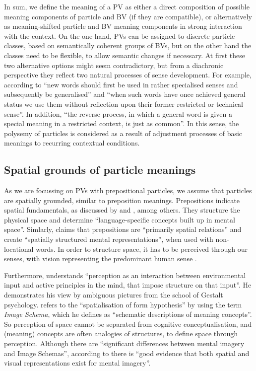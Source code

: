 \documentclass[output=paper]{langsci/langscibook}
\begin{document}
In sum, we define the meaning of a PV as either a direct composition
of possible meaning components of particle and BV (if they are
compatible), or alternatively as meaning-shifted particle and BV
meaning components in strong interaction with the context. On the one
hand, PVs can be assigned to discrete particle classes, based on
semantically coherent groups of BVs, but on the other hand the classes
need to be flexible, to allow semantic changes if necessary. At first
these two alternative options might seem contradictory, but from a
diachronic perspective they reflect two natural processes of sense
development. For example, according to \cite{Waldron:79} ``new words
should first be used in rather specialised senses and subsequently be
generalised'' and ``when such words have once achieved general status
we use them without reflection upon their former restricted or
technical sense''. In addition, ``the reverse process, in which a
general word is given a special meaning in a restricted context, is
just as common''. In this sense, the polysemy of particles is
considered as a result of adjustment processes of basic meanings to
recurring contextual conditions.

\subsection{Spatial grounds of particle meanings}

As we are focussing on PVs with prepositional particles, we assume
that particles are spatially grounded, similar to preposition
meanings. Prepositions indicate spatial fundamentals, as discussed by
\cite{Herskovits:86} and \cite{Dirven:93}, among others. They
structure the physical space and determine ``language-specific
concepts built up in mental space''. Simlarly, \cite{Gaerdenfors:04}
claims that prepositions are ``primarily spatial relations'' and
create ``spatially structured mental representations'', when used with
non-locational words. In order to structure space, it has to be
perceived through our senses, with vision representing the predominant
human sense \citep{Viberg:83}.

Furthermore, \cite{Jackendoff:83} understands ``perception as an
interaction between environmental input and active principles in the
mind, that impose structure on that input''. He demonstrates his view
by ambiguous pictures from the school of Gestalt psychology.
\cite{Lakoff:87} refers to the ``spatialisation of form hypothesis''
by using the term \textit{Image Schema}, which he defines as
``schematic descriptions of meaning concepts''. So perception of space
cannot be separated from cognitive conceptualisation, and (meaning)
concepts are often analogies of structures, to define space through
perception. Although there are ``significant differences between
mental imagery and Image Schemas'', according to
\cite{Gibbs/Colston:95} there is ``good evidence that both spatial and
visual representations exist for mental imagery''.
\end{document}
